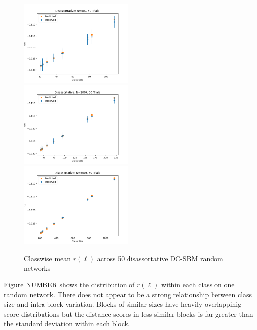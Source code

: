 \documentclass[12pt]{article}
\begin{document}
\begin{figure}[h!]
\includegraphics[width=0.5\textwidth]{disassortative_N_500_trials_50.png}
\includegraphics[width=0.5\textwidth]{disassortative_N_1000_trials_50.png}
\includegraphics[width=0.5\textwidth]{disassortative_N_5000_trials_50.png}
\caption{Classwise mean $r(\ell)$ across 50 disassortative DC-SBM random networks}
\end{figure}

Figure NUMBER shows the distribution of $r(\ell)$ within each class on one random network.  There does not appear to be a strong relationship between class size and intra-block variation.  Blocks of similar sizes have heavily overlappinig score distributions but the distance scores in less similar blocks is far greater than the standard deviation within each block.   
\end{document}
